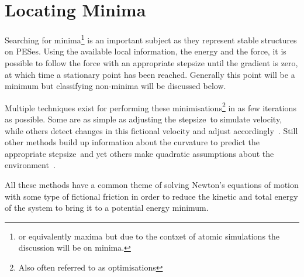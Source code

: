 \section{Locating Minima}
\label{sec:minima}

Searching for minima\footnote{or equivalently maxima but due to the contxet of atomic simulations the discussion will be on minima.} is an important subject as they represent stable structures on PESes.
Using the available local information, the energy and the force, it is possible to follow the force with an appropriate stepsize until the gradient is zero, at which time a stationary point has been reached.
Generally this point will be a minimum but classifying non-minima will be discussed below.

Multiple techniques exist for performing these minimisations\footnote{Also often referred to as optimisations} in as few iterations as possible.
Some are as simple as adjusting the stepsize~\citemiss to simulate velocity, while others detect changes in this fictional velocity and adjust accordingly~\citemiss.
Still other methods build up information about the curvature to predict the appropriate stepsize~\citemiss and yet others make quadratic assumptions about the environment~\citemiss.

All these methods have a common theme of solving Newton's equations of motion with some type of fictional friction in order to reduce the kinetic and total energy of the system to bring it to a potential energy minimum.
